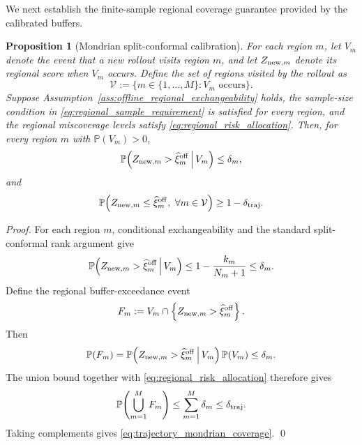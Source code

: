 \documentclass[letterpaper,10pt,conference]{ieeeconf}
\newtheorem{proposition}{Proposition}
\newcommand{\PP}{\mathbb{P}}
\begin{document}
We next establish the finite-sample regional coverage guarantee provided by the
calibrated buffers.

\begin{proposition}[Mondrian split-conformal calibration]
\label{prop:mondrian_initialization}
For each region $m$, let $V_m$ denote the event that a new rollout visits
region $m$, and let $Z_{{\rm new},m}$ denote its regional score when $V_m$
occurs. Define the set of regions visited by the rollout as
\begin{equation}
    \mathcal V:=
    \{m\in\{1,\ldots,M\}:V_m\text{ occurs}\}.
    \label{eq:visited_region_set}
\end{equation}
Suppose Assumption~\ref{ass:offline_regional_exchangeability} holds, the
sample-size condition in \eqref{eq:regional_sample_requirement} is satisfied
for every region, and the regional miscoverage levels satisfy
\eqref{eq:regional_risk_allocation}. Then, for every region $m$ with
$\PP(V_m)>0$,
\begin{equation}
    \PP\!\left(
        Z_{{\rm new},m}>\widehat\xi^{\rm off}_{m}
        \,\middle|\,V_m
    \right)
    \leq\delta_m,
    \label{eq:conditional_mondrian_coverage}
\end{equation}
and
\begin{equation}
    \PP\!\left(
        Z_{{\rm new},m}\leq\widehat\xi^{\rm off}_{m},
        \ \forall m\in\mathcal V
    \right)
    \geq1-\delta_{\rm traj}.
    \label{eq:trajectory_mondrian_coverage}
\end{equation}
\end{proposition}

\begin{proof}
For each region $m$, conditional exchangeability and the standard
split-conformal rank argument
\cite{vovk2013conditional,lei2018distributionfree} give
\begin{equation*}
    \PP\!\left(
        Z_{{\rm new},m}>\widehat\xi^{\rm off}_{m}
        \,\middle|\,V_m
    \right)
    \leq
    1-\frac{k_m}{N_m+1}
    \leq\delta_m.
\end{equation*}
Define the regional buffer-exceedance event
\[
    F_m:=
    V_m\cap
    \left\{
        Z_{{\rm new},m}>\widehat\xi^{\rm off}_{m}
    \right\}.
\]
Then
\[
    \PP(F_m)
    =
    \PP\!\left(
        Z_{{\rm new},m}>\widehat\xi^{\rm off}_{m}
        \,\middle|\,V_m
    \right)\PP(V_m)
    \leq\delta_m.
\]
The union bound together with \eqref{eq:regional_risk_allocation} therefore
gives
\begin{equation*}
    \PP\!\left(\bigcup_{m=1}^{M}F_m\right)
    \leq
    \sum_{m=1}^{M}\delta_m
    \leq\delta_{\rm traj}.
\end{equation*}
Taking complements gives \eqref{eq:trajectory_mondrian_coverage}.
\hfill\qed
\end{proof}
\end{document}
